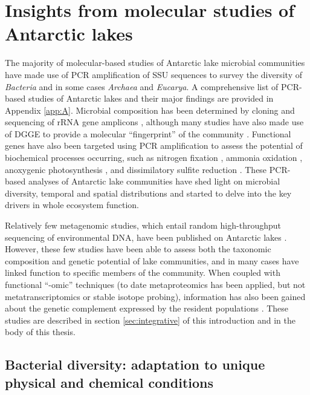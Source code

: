 \section{Insights from molecular studies of Antarctic lakes}
\label{in:insights}
The majority of molecular-based studies of Antarctic lake microbial communities have made use of \ac{PCR} amplification of \ac{SSU} sequences to survey the diversity of \emph{Bacteria} and in some cases \emph{Archaea} and \emph{Eucarya}.
A comprehensive list of PCR-based studies of Antarctic lakes and their major findings are provided in Appendix \ref{app:A}.
Microbial composition has been determined by cloning and sequencing of \ac{rRNA} gene amplicons 
\cite{Bowman2000a, Bowman2000b, Gordon2000, Christner2001, Purdy2003, Karr2006, Matsuzaki2006, Kurosawa2010, Bielewicz2011}, 
although many studies have also made use of \ac{DGGE} to provide a molecular ``fingerprint'' of the community 
\cite{Pearce2003a, Pearce2003b, Karr2005, Pearce2005a, Pearce2005b, Unrein2005, Glatz2006, Mikucki2007, Mosier2007, Schiaffino2009, Villaescusa2010}.
Functional genes have also been targeted using \ac{PCR} amplification to assess the potential of biochemical processes occurring, such as nitrogen fixation \cite{Olson1998}, ammonia oxidation \cite{Voytek1999}, anoxygenic photosynthesis \cite{Karr2003}, and dissimilatory sulfite reduction \cite{Karr2005, Mikucki2009}. %
These \ac{PCR}-based analyses of Antarctic lake communities have shed light on microbial diversity, temporal and spatial distributions and started to delve into the key drivers in whole ecosystem function.

Relatively few metagenomic studies, which entail random high-throughput sequencing of environmental \textsc{DNA}, have been published on Antarctic lakes \cite{Lopez-Bueno2009, Ng2010a, Lauro2011, Yau2011}.
However, these few studies have been able to assess both the taxonomic composition and genetic potential of lake communities, and in many cases have linked function to specific members of the community.
When coupled with functional ``-omic'' techniques (to date metaproteomics has been applied, but not metatranscriptomics or stable isotope probing), information has also been gained about the genetic complement expressed by the resident populations \cite{Ng2010a,Lauro2011,Yau2011}.
These studies are described in section \ref{sec:integrative} of this introduction and in the body of this thesis.
\subsection{Bacterial diversity: adaptation to unique physical and chemical conditions}

